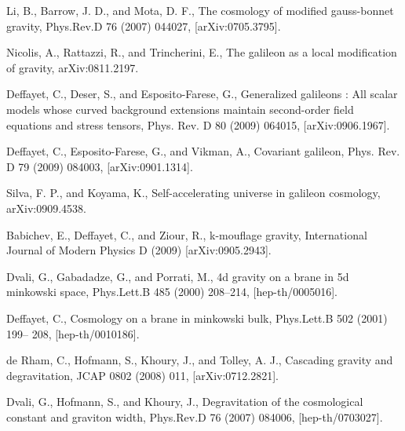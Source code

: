 \documentclass[a4paper,12pt]{report}
\theoremstyle{plain}
\theoremstyle{plain}
\begin{document}
\begin{thebibliography}{90}
 Li, B., Barrow, J. D., and Mota, D. F., The cosmology of modified gauss-bonnet
gravity, Phys.Rev.D 76 (2007) 044027, [arXiv:0705.3795].

 Nicolis, A., Rattazzi, R., and Trincherini, E., The galileon as a local modification of
gravity, arXiv:0811.2197.

 Deffayet, C., Deser, S., and Esposito-Farese, G., Generalized galileons : All scalar
models whose curved background extensions maintain second-order field equations
and stress tensors, Phys. Rev. D 80 (2009) 064015, [arXiv:0906.1967].

 Deffayet, C., Esposito-Farese, G., and Vikman, A., Covariant galileon, Phys. Rev. D
79 (2009) 084003, [arXiv:0901.1314].

 Silva, F. P., and Koyama, K., Self-accelerating universe in galileon cosmology,
arXiv:0909.4538.

 Babichev, E., Deffayet, C., and Ziour, R., k-mouflage gravity, International Journal
of Modern Physics D (2009) [arXiv:0905.2943].

 Dvali, G., Gabadadze, G., and Porrati, M., 4d gravity on a brane in 5d minkowski
space, Phys.Lett.B 485 (2000) 208–214, [hep-th/0005016].

 Deffayet, C., Cosmology on a brane in minkowski bulk, Phys.Lett.B 502 (2001) 199–
208, [hep-th/0010186].

 de Rham, C., Hofmann, S., Khoury, J., and Tolley, A. J., Cascading gravity and
degravitation, JCAP 0802 (2008) 011, [arXiv:0712.2821].

 Dvali, G., Hofmann, S., and Khoury, J., Degravitation of the cosmological constant
and graviton width, Phys.Rev.D 76 (2007) 084006, [hep-th/0703027].




\end{thebibliography}
\end{document}
